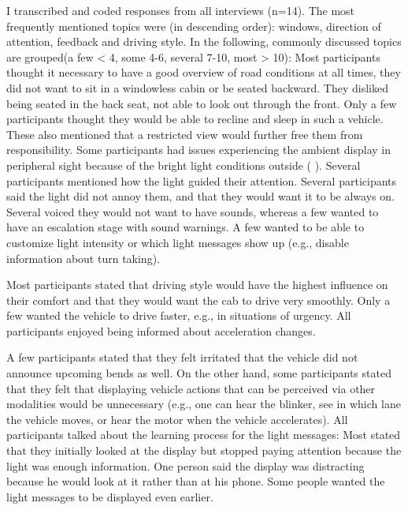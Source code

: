 I transcribed and coded responses from all interviews (n=14). The most frequently mentioned topics were (in descending order): windows, direction of attention, feedback and driving style. In the following, commonly discussed topics are grouped(a few < 4, some 4-6, several 7-10, most > 10): Most participants thought it necessary to have a good overview of road conditions at all times, they did not want to sit in a windowless cabin or be seated backward. They disliked being seated in the back seat, not able to look out through the front. Only a few participants thought they would be able to recline and sleep in such a vehicle. These also mentioned that a restricted view would further free them from responsibility. Some participants had issues experiencing the ambient display in peripheral sight because of the bright light conditions outside ( ). Several participants mentioned how the light guided their attention. Several participants said the light did not annoy them, and that they would want it to be always on. Several voiced they would not want to have sounds, whereas a few wanted to have an escalation stage with sound warnings. A few wanted to be able to customize light intensity or which light messages show up (e.g., disable information about turn taking). %
\begin{quotation}\end{quotation}
Most participants stated that driving style would have the highest influence on their comfort and that they would want the cab to drive very smoothly. Only a few wanted the vehicle to drive faster, e.g., in situations of urgency. All participants enjoyed being informed about acceleration changes.
\begin{quotation}\end{quotation}
 A few participants stated that they felt irritated that the vehicle did not announce upcoming bends as well. On the other hand, some participants stated that they felt that displaying vehicle actions that can be perceived via other modalities would be unnecessary (e.g., one can hear the blinker, see in which lane the vehicle moves, or hear the motor when the vehicle accelerates). All participants talked about the learning process for the light messages: Most stated that they initially looked at the display but stopped paying attention because the light was enough information. One person said the display was distracting because he would look at it rather than at his phone. Some people wanted the light messages to be displayed even earlier. \begin{quotation}\end{quotation}

